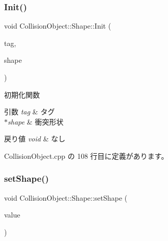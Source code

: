 \mbox{\label{class_collision_object_1_1_shape_acb8e74104e7a77a7d4a19165e361d9a8}} 
\subsubsection{\texorpdfstring{Init()}{Init()}}
{\footnotesize\ttfamily void Collision\+Object\+::\+Shape\+::\+Init (\begin{DoxyParamCaption}\item[{int}]{tag,  }\item[{\mbox{\hyperlink{class_collision_shape_base}{Collision\+Shape\+Base}} $\ast$}]{shape }\end{DoxyParamCaption})}



初期化関数 


\begin{DoxyParams}{引数}
{\em tag} & タグ \\
\hline
{\em $\ast$shape} & 衝突形状 \\
\hline
\end{DoxyParams}

\begin{DoxyRetVals}{戻り値}
{\em void} & なし \\
\hline
\end{DoxyRetVals}


 Collision\+Object.\+cpp の 108 行目に定義があります。

\mbox{\label{class_collision_object_1_1_shape_a3eeea0fcf0f2f722075327560f2599be}} 
\subsubsection{\texorpdfstring{set\+Shape()}{setShape()}}
{\footnotesize\ttfamily void Collision\+Object\+::\+Shape\+::set\+Shape (\begin{DoxyParamCaption}\item[{\mbox{\hyperlink{class_collision_shape_base}{Collision\+Shape\+Base}} $\ast$}]{value }\end{DoxyParamCaption})}



